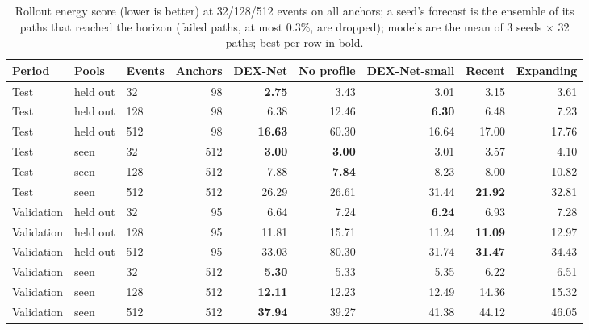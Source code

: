 \begin{table}[t]
\centering
\small
\caption{Rollout energy score (lower is better) at 32/128/512 events on all anchors; a seed’s forecast is the ensemble of its paths that reached the horizon (failed paths, at most 0.3\%, are dropped); models are the mean of 3 seeds $\times$ 32 paths; best per row in bold.}
\label{tab:rollout_energy}
\begin{adjustbox}{max width=\linewidth}
\begin{tabular}{lllrrrrrr}
\toprule
Period & Pools & Events & Anchors & DEX-Net & No profile & DEX-Net-small & Recent & Expanding \\
\midrule
Test & held out & 32 & 98 & \textbf{2.75} & 3.43 & 3.01 & 3.15 & 3.61 \\
Test & held out & 128 & 98 & 6.38 & 12.46 & \textbf{6.30} & 6.48 & 7.23 \\
Test & held out & 512 & 98 & \textbf{16.63} & 60.30 & 16.64 & 17.00 & 17.76 \\
\midrule
Test & seen & 32 & 512 & \textbf{3.00} & \textbf{3.00} & 3.01 & 3.57 & 4.10 \\
Test & seen & 128 & 512 & 7.88 & \textbf{7.84} & 8.23 & 8.00 & 10.82 \\
Test & seen & 512 & 512 & 26.29 & 26.61 & 31.44 & \textbf{21.92} & 32.81 \\
\midrule
Validation & held out & 32 & 95 & 6.64 & 7.24 & \textbf{6.24} & 6.93 & 7.28 \\
Validation & held out & 128 & 95 & 11.81 & 15.71 & 11.24 & \textbf{11.09} & 12.97 \\
Validation & held out & 512 & 95 & 33.03 & 80.30 & 31.74 & \textbf{31.47} & 34.43 \\
\midrule
Validation & seen & 32 & 512 & \textbf{5.30} & 5.33 & 5.35 & 6.22 & 6.51 \\
Validation & seen & 128 & 512 & \textbf{12.11} & 12.23 & 12.49 & 14.36 & 15.32 \\
Validation & seen & 512 & 512 & \textbf{37.94} & 39.27 & 41.38 & 44.12 & 46.05 \\
\bottomrule
\end{tabular}
\end{adjustbox}
\end{table}
